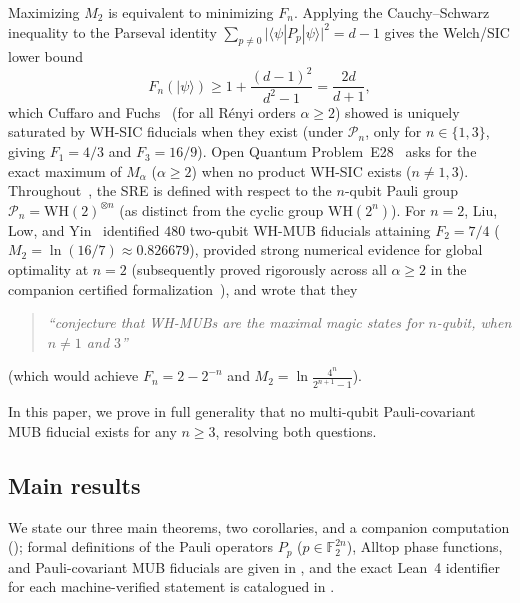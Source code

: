 \documentclass[11pt,a4paper]{article}
\theoremstyle{plain}
\theoremstyle{definition}
\theoremstyle{remark}
\newcommand{\F}{\mathbb{F}}
\newcommand{\Pauli}{\mathcal{P}}
\newcommand{\ket}[1]{|#1\rangle}
\newcommand{\expval}[2]{\langle#1|#2|#1\rangle}
\newcommand{\abs}[1]{\lvert#1\rvert}
\numberwithin{equation}{section}
\begin{document}
\begin{enumerate}[leftmargin=1.8em]
  Maximizing $M_2$ is equivalent to minimizing $F_n$. Applying the Cauchy--Schwarz inequality to the Parseval identity $\sum_{p \neq 0} \abs{\expval{\psi}{P_p}}^2 = d - 1$ gives the Welch/SIC lower bound
  \begin{equation}\label{eq:welch-bound}
    F_n(\ket{\psi}) \ge 1 + \frac{(d-1)^2}{d^2 - 1} = \frac{2d}{d+1},
  \end{equation}
  which Cuffaro and Fuchs~\cite{cuffaro2024quantum} (for all R\'enyi orders $\alpha \ge 2$) showed is uniquely saturated by WH-SIC fiducials when they exist (under $\Pauli_n$, only for $n \in \{1, 3\}$, giving $F_1 = 4/3$ and $F_3 = 16/9$). Open Quantum Problem~E28~\cite{oqpE28} asks for the exact maximum of $M_\alpha$ ($\alpha \ge 2$) when no product WH-SIC exists ($n \neq 1, 3$). Throughout~\cite{liu2026maximal,oqpE28}, the SRE is defined with respect to the $n$-qubit Pauli group $\Pauli_n = \mathrm{WH}(2)^{\otimes n}$ (as distinct from the cyclic group $\mathrm{WH}(2^n)$). For $n = 2$, Liu, Low, and Yin~\cite{liu2026maximal} identified $480$ two-qubit WH-MUB fiducials attaining $F_2 = 7/4$ ($M_2 = \ln(16/7) \approx 0.826679$), provided strong numerical evidence for global optimality at $n = 2$ (subsequently proved rigorously across all $\alpha \ge 2$ in the companion certified formalization~\cite{ye2026twoqubit}), and wrote that they
  \begin{quote}\small\itshape
    ``conjecture that WH-MUBs are the maximal magic states for $n$-qubit, when $n \neq 1$ and $3$''
  \end{quote}
  (which would achieve $F_n = 2 - 2^{-n}$ and $M_2 = \ln\frac{4^n}{2^{n+1}-1}$).
\end{enumerate}

In this paper, we prove in full generality that no multi-qubit Pauli-covariant MUB fiducial exists for any $n \ge 3$, resolving both questions.

\subsection{Main results}\label{sec:main-results}

We state our three main theorems, two corollaries, and a companion computation (); formal definitions of the Pauli operators $P_p$ ($p \in \F_2^{2n}$), Alltop phase functions, and Pauli-covariant MUB fiducials are given in , and the exact Lean~4 identifier for each machine-verified statement is catalogued in .
\end{document}
